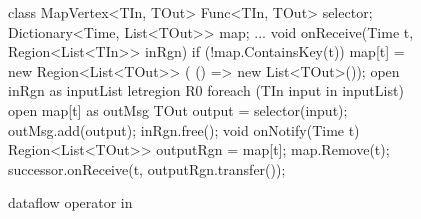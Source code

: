 \begin{figure}[t!]
\begin{numcodejava}
class MapVertex<TIn, TOut> {
  Func<TIn, TOut> selector;
  Dictionary<Time, List<TOut>> map;
  ...
  void onReceive(Time t, Region<List<TIn>> inRgn) {
    if (!map.ContainsKey(t))
       map[t] = new Region<List<TOut>> (
                  () => new List<TOut>());
    open inRgn as inputList {
      letregion R0 {
        foreach (TIn input in inputList) {
          open map[t] as outMsg {
            TOut output = selector(input);
            outMsg.add(output);
          }
        }
      }
    }
    inRgn.free();
  }
  void onNotify(Time t) {
     Region<List<TOut>> outputRgn = map[t];
     map.Remove(t);
     successor.onReceive(t, outputRgn.transfer()); 
  }
}
\end{numcodejava}
\caption{ dataflow operator in \name}
\label{fig:motivating-eg-in-broom}
\end{figure}
